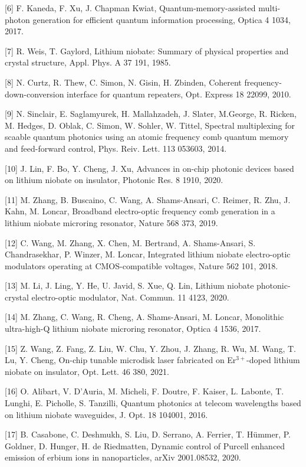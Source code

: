 \documentclass[prl,reprint,superscriptaddress]{revtex4-1}
\begin{document}
[6] 	F. Kaneda, F. Xu, J. Chapman Kwiat, Quantum-memory-assisted multi-photon generation for efficient quantum information processing, Optica 4 1034, 2017. 

[7] 	R. Weis, T. Gaylord, Lithium niobate: Summary of physical properties and crystal structure, Appl. Phys. A 37 191, 1985. 

[8] 	N. Curtz, R. Thew, C. Simon, N. Gisin, H. Zbinden, Coherent frequency-down-conversion interface for quantum repeaters, Opt. Express 18 22099, 2010. 

[9] 	N. Sinclair, E. Saglamyurek, H. Mallahzadeh, J. Slater, M.George, R. Ricken, M. Hedges, D. Oblak, C. Simon, W. Sohler, W. Tittel, Spectral multiplexing for scaable quantum photonics using an atomic frequency comb quantum memory and feed-forward control, Phys. Reiv. Lett. 113 053603, 2014. 


[10] 	J. Lin, F. Bo, Y. Cheng, J. Xu, Advances in on-chip photonic devices based on lithium niobate on insulator, Photonic Res. 8 1910, 2020. 

[11] 	M. Zhang, B. Buscaino, C. Wang, A. Shams-Ansari, C. Reimer, R. Zhu, J. Kahn, M. Loncar, Broadband electro-optic frequency comb generation in a lithium niobate microring resonator, Nature 568 373, 2019. 

[12] 	C. Wang, M. Zhang, X. Chen, M. Bertrand, A. Shams-Ansari, S. Chandrasekhar, P. Winzer, M. Loncar, Integrated lithium niobate electro-optic modulators operating at CMOS-compatible voltages, Nature 562 101, 2018. 

[13] 	M. Li, J. Ling, Y. He, U. Javid, S. Xue, Q. Lin, Lithium niobate photonic-crystal electro-optic modulator, Nat. Commun. 11 4123, 2020. 

[14] 	M. Zhang, C. Wang, R. Cheng, A. Shams-Ansari, M. Loncar, Monolithic ultra-high-Q lithium niobate microring resonator, Optica 4 1536, 2017. 

[15] 	Z. Wang, Z. Fang, Z. Liu, W. Chu, Y. Zhou, J. Zhang, R. Wu, M. Wang, T. Lu, Y. Cheng, On-chip tunable microdisk laser fabricated on Er$^{3+}$-doped lithium niobate on insulator, Opt. Lett. 46 380, 2021. 

[16] 	O. Alibart, V. D'Auria, M. Micheli, F. Doutre, F. Kaiser, L. Labonte, T. Lunghi, E. Picholle, S. Tanzilli, Quantum photonics at telecom wavelengths based on lithium niobate waveguides, J. Opt. 18 104001, 2016. 

[17] 	B. Casabone, C. Deshmukh, S. Liu, D. Serrano, A. Ferrier, T. Hümmer, P. Goldner, D. Hunger, H. de Riedmatten, Dynamic control of Purcell enhanced emission of erbium ions in nanoparticles, arXiv 2001.08532, 2020. 
\end{document}
